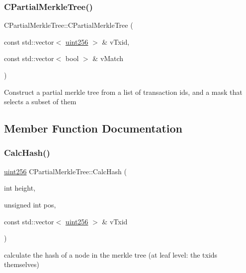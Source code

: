 \subsubsection{\texorpdfstring{CPartialMerkleTree()}{CPartialMerkleTree()}}
{\footnotesize\ttfamily C\+Partial\+Merkle\+Tree\+::\+C\+Partial\+Merkle\+Tree (\begin{DoxyParamCaption}\item[{const std\+::vector$<$ \mbox{\hyperlink{classuint256}{uint256}} $>$ \&}]{v\+Txid,  }\item[{const std\+::vector$<$ bool $>$ \&}]{v\+Match }\end{DoxyParamCaption})}

Construct a partial merkle tree from a list of transaction id\textquotesingle{}s, and a mask that selects a subset of them 

\subsection{Member Function Documentation}
\mbox{\label{class_c_partial_merkle_tree_a69e7771f95c498f6a340dcc227abcde4}} 
\subsubsection{\texorpdfstring{CalcHash()}{CalcHash()}}
{\footnotesize\ttfamily \mbox{\hyperlink{classuint256}{uint256}} C\+Partial\+Merkle\+Tree\+::\+Calc\+Hash (\begin{DoxyParamCaption}\item[{int}]{height,  }\item[{unsigned int}]{pos,  }\item[{const std\+::vector$<$ \mbox{\hyperlink{classuint256}{uint256}} $>$ \&}]{v\+Txid }\end{DoxyParamCaption})\hspace{0.3cm}{\ttfamily [protected]}}

calculate the hash of a node in the merkle tree (at leaf level\+: the txid\textquotesingle{}s themselves) \mbox{\label{class_c_partial_merkle_tree_a7dd0288d62321fb5aa2c27a3372ee8fe}} 
